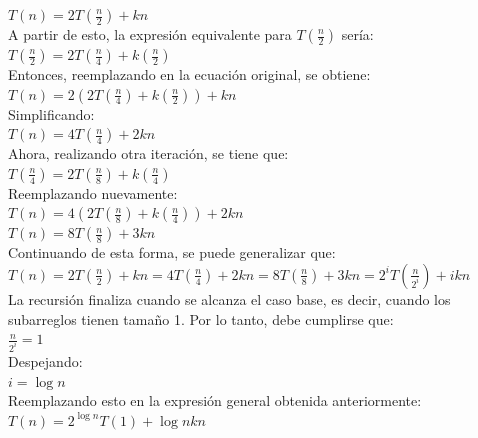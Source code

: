 $T(n) = 2 T(\frac{n}{2}) + kn$ \\

A partir de esto, la expresión equivalente para $T(\frac{n}{2})$ sería: \\

$T(\frac{n}{2}) = 2 T(\frac{n}{4}) + k(\frac{n}{2})$ \\

Entonces, reemplazando en la ecuación original, se obtiene: \\

$T(n) = 2 \left( 2 T(\frac{n}{4}) + k(\frac{n}{2}) \right) + kn$ \\

Simplificando: \\

$T(n) = 4T(\frac{n}{4}) + 2kn$ \\

Ahora, realizando otra iteración, se tiene que: \\

$T(\frac{n}{4}) = 2 T(\frac{n}{8}) + k(\frac{n}{4})$ \\

Reemplazando nuevamente: \\

$T(n) = 4 \left( 2T(\frac{n}{8}) + k(\frac{n}{4}) \right) + 2kn$ \\

$T(n) = 8T(\frac{n}{8}) + 3kn$ \\

Continuando de esta forma, se puede generalizar que: \\

$T(n) = 2T(\frac{n}{2}) + kn = 4T(\frac{n}{4}) + 2kn = 8T(\frac{n}{8}) + 3kn = 2^i T(\frac{n}{2^i}) + ikn$ \\

La recursión finaliza cuando se alcanza el caso base, es decir, cuando los subarreglos tienen tamaño 1. Por lo tanto, debe cumplirse que: \\

$\frac{n}{2^i} = 1$ \\

Despejando: \\

$i = \log n$ \\

Reemplazando esto en la expresión general obtenida anteriormente: \\

$T(n) = 2^{\log n} T(1) + \log n kn$ \\

